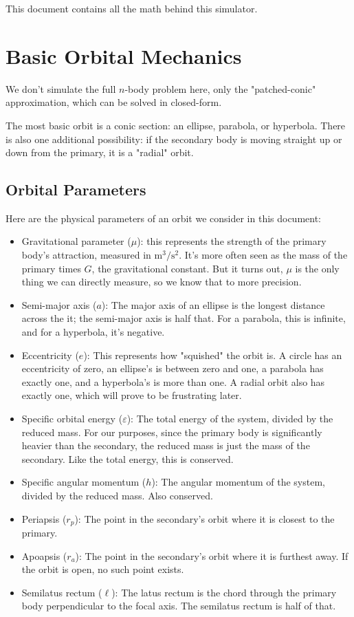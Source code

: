\documentclass{article}
\numberwithin{equation}{subsection}
\begin{document}
This document contains all the math behind this simulator.

\tableofcontents


\section{Basic Orbital Mechanics}

We don't simulate the full $n$-body problem here, only the "patched-conic" approximation, which can be solved in closed-form.

The most basic orbit is a conic section: an ellipse, parabola, or hyperbola. There is also one additional possibility: if the secondary body is moving straight up or down from the primary, it is a "radial" orbit.


\subsection{Orbital Parameters}

Here are the physical parameters of an orbit we consider in this document:
\begin{itemize}
\item Gravitational parameter ($\mu$): this represents the strength of the primary body's attraction, measured in $\mathrm{m^3/s^2}$. It's more often seen as the mass of the primary times $G$, the gravitational constant. But it turns out, $\mu$ is the only thing we can directly measure, so we know that to more precision.
\item Semi-major axis ($a$): The major axis of an ellipse is the longest distance across the it; the semi-major axis is half that. For a parabola, this is infinite, and for a hyperbola, it's negative.
\item Eccentricity ($e$): This represents how "squished" the orbit is. A circle has an eccentricity of zero, an ellipse's is between zero and one, a parabola has exactly one, and a hyperbola's is more than one. A radial orbit also has exactly one, which will prove to be frustrating later.
\item Specific orbital energy ($\varepsilon$): The total energy of the system, divided by the reduced mass. For our purposes, since the primary body is significantly heavier than the secondary, the reduced mass is just the mass of the secondary. Like the total energy, this is conserved.
\item Specific angular momentum ($h$): The angular momentum of the system, divided by the reduced mass. Also conserved.
\item Periapsis ($r_p$): The point in the secondary's orbit where it is closest to the primary.
\item Apoapsis ($r_a$): The point in the secondary's orbit where it is furthest away. If the orbit is open, no such point exists.
\item Semilatus rectum ($\ell$): The latus rectum is the chord through the primary body perpendicular to the focal axis. The semilatus rectum is half of that.
\end{itemize}
\end{document}
